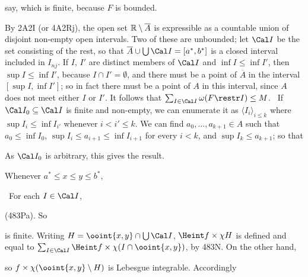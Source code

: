 {\noindent say, which is finite, because $F$ is bounded.

\medskip

 By 2A2I (or 4A2Rj), the open set
$\Bbb R\setminus\overline{A}$ is expressible as a countable union of
disjoint non-empty open intervals.   Two of these are unbounded;  let
$\Cal I$ be the set consisting of the rest, so that
$\overline{A}\cup\bigcup\Cal I=[a^*,b^*]$ is a closed interval included
in $I_{nj}$.   If $I$, $I'$ are distinct members of $\Cal I$ and
$\inf I\le\inf I'$, then $\sup I\le\inf I'$, because
$I\cap I'=\emptyset$, and there must be a point of $\overline{A}$ in the
interval $[\sup I,\inf I']$;  so in fact there must be a point of $A$ in
this interval, since $A$ does not meet either $I$ or $I'$.
It follows that
$\sum_{I\in\Cal I}\omega(F\restr I)\le M$.   \Prf\ If
$\Cal I_0\subseteq\Cal I$ is finite and non-empty, we can enumerate it
as $\langle I_i\rangle_{i\le k}$ where $\sup I_i\le\inf I_{i'}$ whenever
$i<i'\le k$.   We can find $a_0,\ldots,a_{k+1}\in A$ such that
$a_0\le\inf I_0$, $\sup I_i\le a_{i+1}\le\inf I_{i+1}$ for every $i<k$,
and $\sup I_k\le a_{k+1}$;  so that


\noindent As $\Cal I_0$ is arbitrary, this gives the result.\ \Qed

\medskip

 Whenever $a^*\le x\le y\le b^*$,


\noindent \Prf\ For each $I\in\Cal I$,


\noindent (483Pa).   So


\noindent is finite.   Writing $H=\ooint{x,y}\cap\bigcup\Cal I$,
$\Heint f\times\chi H$ is defined and equal to
$\sum_{I\in\Cal I}\Heint f\times\chi(I\cap\ooint{x,y})$, by 483N.
On the other hand,


\noindent so $f\times\chi(\ooint{x,y}\setminus H)$ is Lebesgue
integrable.   Accordingly

}
